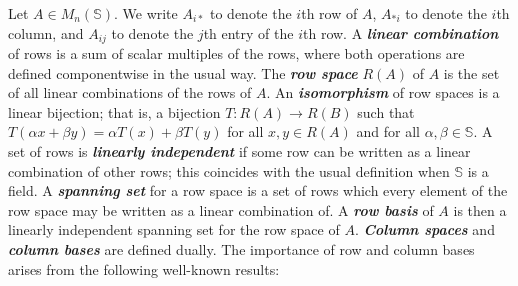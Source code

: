 \documentclass[11pt]{article}
\newcommand{\defn}[1]{\textbf{\textit{#1}}}
\numberwithin{equation}{section}
\renewcommand{\to}{\longrightarrow}
\begin{document}
Let $A \in M_n(\mathbb{S})$. We write $A_{i*}$ to denote the $i$th row of $A$,
$A_{*i}$ to denote the $i$th column, and $A_{ij}$ to denote the $j$th entry of
the $i$th row. A \defn{linear combination} of rows is a sum of scalar multiples
of the rows, where both operations are defined componentwise in the usual way.
The \defn{row space} $R(A)$ of $A$ is the set of all linear combinations of the
rows of $A$. An \defn{isomorphism} of row spaces is a linear bijection; that is,
a bijection $T: R(A) \to R(B)$ such that $T(\alpha x + \beta y) = \alpha T(x) +
\beta T(y)$ for all $x, y \in R(A)$ and for all $\alpha, \beta \in \mathbb{S}$.
A set of rows is \defn{linearly independent} if some row can be written as a
linear combination of other rows; this coincides with the usual definition when
$\mathbb{S}$ is a field. A \defn{spanning set} for a row space is a set of rows
which every element of the row space may be written as a linear combination of.
A \defn{row basis} of $A$ is then a linearly independent spanning set for the
row space of $A$. \defn{Column spaces} and \defn{column bases} are defined
dually. The importance of row and column bases arises from the following
well-known results:
\end{document}
